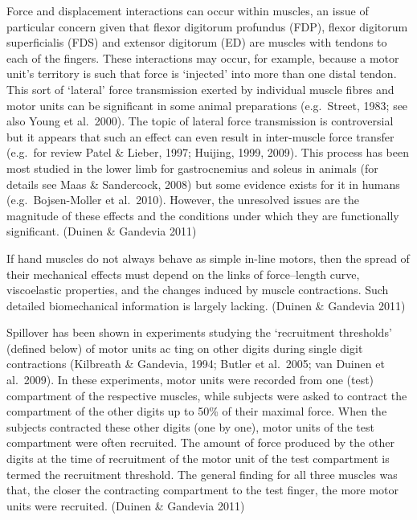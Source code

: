 {            Force and displacement interactions can occur within
            muscles, an issue of particular concern given that ﬂexor
            digitorum profundus (FDP), ﬂexor digitorum superficialis
            (FDS) and extensor digitorum (ED) are muscles with tendons
            to each of the fingers. These interactions may occur, for
            example, because a motor unit's territory is such that force
            is `injected' into more than one distal tendon. This sort of
            `lateral' force transmission exerted by individual muscle
            fibres and motor units can be significant in some animal
            preparations (e.g.~Street, 1983; see also Young et
            al.~2000). The topic of lateral force transmission is
            controversial but it appears that such an effect can even
            result in inter-muscle force transfer (e.g.~for review Patel
            \& Lieber, 1997; Huijing, 1999, 2009). This process has been
            most studied in the lower limb for gastrocnemius and soleus
            in animals (for details see Maas \& Sandercock, 2008) but
            some evidence exists for it in humans (e.g.~Bojsen-Moller et
            al.~2010). However, the unresolved issues are the magnitude
            of these effects and the conditions under which they are
            functionally significant. (Duinen \& Gandevia 2011)

            If hand muscles do not always behave as simple in-line
            motors, then the spread of their mechanical effects must
            depend on the links of force--length curve, viscoelastic
            properties, and the changes induced by muscle contractions.
            Such detailed biomechanical information is largely lacking.
            (Duinen \& Gandevia 2011)

            Spillover has been shown in experiments studying the
            `recruitment thresholds' (defined below) of motor units ac
            ting on other digits during single digit contractions
            (Kilbreath \& Gandevia, 1994; Butler et al.~2005; van Duinen
            et al.~2009). In these experiments, motor units were
            recorded from one (test) compartment of the respective
            muscles, while subjects were asked to contract the
            compartment of the other digits up to 50\% of their maximal
            force. When the subjects contracted these other digits (one
            by one), motor units of the test compartment were often
            recruited. The amount of force produced by the other digits
            at the time of recruitment of the motor unit of the test
            compartment is termed the recruitment threshold. The general
            finding for all three muscles was that, the closer the
            contracting compartment to the test finger, the more motor
            units were recruited. (Duinen \& Gandevia 2011)

}
